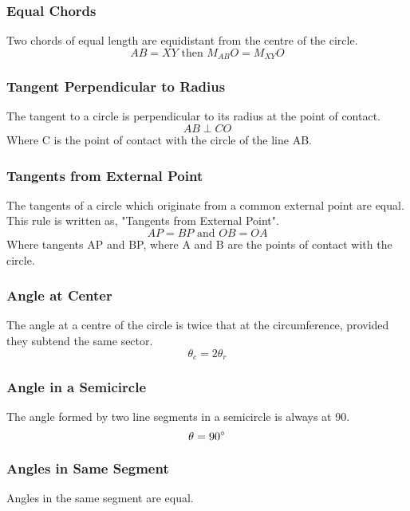 \documentclass{report}
\begin{document}
\begin{flushleft}
\subsubsection{Equal Chords}
Two chords of equal length are equidistant from the centre of the circle.
\begin{equation}
AB = XY \text{ then } M_{AB}O = M_{XY}O
\end{equation}

\subsubsection{Tangent Perpendicular to Radius}
The tangent to a circle is perpendicular to its radius at the point of contact.
\begin{equation}
AB \perp CO
\end{equation}
Where C is the point of contact with the circle of the line AB.

\subsubsection{Tangents from External Point}
The tangents of a circle which originate from a common external point are equal. This rule is written as, "Tangents from External Point".
\begin{equation}
AP = BP \text{ and } OB = OA
\end{equation}
Where tangents AP and BP, where A and B are the points of contact with the circle.

\subsubsection{Angle at Center}
The angle at a centre of the circle is twice that at the circumference, provided they subtend the same sector.
\begin{equation}
\theta_{c} = 2\theta_{r}
\end{equation}

\subsubsection{Angle in a Semicircle}
The angle formed by two line segments in a semicircle is always at 90\degree.
\begin{equation}
\theta = 90\degree
\end{equation}

\subsubsection{Angles in Same Segment}
Angles in the same segment are equal.


\end{flushleft}
\end{document}
